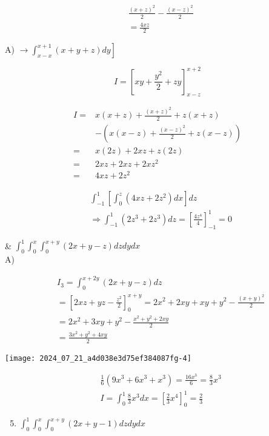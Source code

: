 \documentclass[12pt, a4paper]{article}
\begin{document}
$$
\begin{aligned}
& \frac{(x+z)^{2}}{2}-\frac{(x-z)^{2}}{2} \\
& =\frac{4 x z}{2}
\end{aligned}
$$

A) $\left.\rightarrow \int_{x-x}^{x+1}(x+y+z) d y\right]$

$$
I=\left[x y+\frac{y^{2}}{2}+z y\right]_{x-z}^{x+2}
$$

$$
\begin{aligned}
I= & x(x+z)+\frac{(x+z)^{2}}{2}+z(x+z) \\
& -\left(x(x-z)+\frac{(x-z)^{2}}{2}+z(x-z)\right) \\
= & x(2 z)+2 x z+z(2 z) \\
= & 2 x z+2 x z+2 x z^{2} \\
= & 4 x z+2 z^{2}
\end{aligned}
$$

$$
\begin{aligned}
& \int_{-1}^{1}\left[\int_{0}^{z}\left(4 x z+2 z^{2}\right) d x\right] d z \\
& \Rightarrow \int_{-1}^{1}\left(2 z^{3}+2 z^{3}\right) d z=\left[\frac{4 z^{4}}{4}\right]_{-1}^{1}=0
\end{aligned}
$$

\& $\int_{0}^{1} \int_{0}^{x} \int_{0}^{x+y}(2 x+y-z) d z d y d x$\\
A)

$$
\begin{aligned}
& I_{3}=\int_{0}^{x+2 y}(2 x+y-z) d z \\
& =\left[2 x z+y z-\frac{z^{2}}{2}\right]_{0}^{x+y}=2 x^{2}+2 x y+x y+y^{2}-\frac{(x+y)^{2}}{2} \\
& =2 x^{2}+3 x y+y^{2}-\frac{x^{2}+y^{2}+2 x y}{2} \\
& =\frac{3 x^{2}+y^{2}+4 x y}{2}
\end{aligned}
$$

\begin{center}
\texttt{[image: 2024\_07\_21\_a4d038e3d75ef384087fg-4]}
\end{center}

$$
\begin{aligned}
& \frac{1}{6}\left(9 x^{3}+6 x^{3}+x^{3}\right)=\frac{16 x^{3}}{6}=\frac{8}{3} x^{3} \\
& I=\int_{0}^{1} \frac{8}{3} x^{3} d x=\left[\frac{2}{3} x^{4}\right]_{0}^{1}=\frac{2}{3}
\end{aligned}
$$

\begin{enumerate}
  \setcounter{enumi}{4}
  \item $\int_{0}^{1} \int_{0}^{x} \int_{0}^{x+y}(2 x+y-1) d z d y d x$
\end{enumerate}
\end{document}
